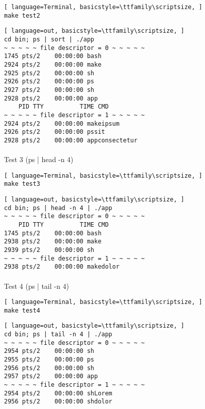 \begin{lstlisting}[ language=Terminal, basicstyle=\ttfamily\scriptsize, ]
make test2
\end{lstlisting}

\begin{lstlisting}[ language=out, basicstyle=\ttfamily\scriptsize, ]
cd bin; ps | sort | ./app
~ ~ ~ ~ ~ file descriptor = 0 ~ ~ ~ ~ ~
1745 pts/2    00:00:00 bash
2924 pts/2    00:00:00 make
2925 pts/2    00:00:00 sh
2926 pts/2    00:00:00 ps
2927 pts/2    00:00:00 sh
2928 pts/2    00:00:00 app
    PID TTY          TIME CMD
~ ~ ~ ~ ~ file descriptor = 1 ~ ~ ~ ~ ~
2924 pts/2    00:00:00 makeipsum
2926 pts/2    00:00:00 pssit
2928 pts/2    00:00:00 appconsectetur
\end{lstlisting}

\paragraph{}
Test 3 (ps | head -n 4)

\begin{lstlisting}[ language=Terminal, basicstyle=\ttfamily\scriptsize, ]
make test3
\end{lstlisting}

\begin{lstlisting}[ language=out, basicstyle=\ttfamily\scriptsize, ]
cd bin; ps | head -n 4 | ./app
~ ~ ~ ~ ~ file descriptor = 0 ~ ~ ~ ~ ~
    PID TTY          TIME CMD
1745 pts/2    00:00:00 bash
2938 pts/2    00:00:00 make
2939 pts/2    00:00:00 sh
~ ~ ~ ~ ~ file descriptor = 1 ~ ~ ~ ~ ~
2938 pts/2    00:00:00 makedolor
\end{lstlisting}

\paragraph{}
Test 4 (ps | tail -n 4)

\begin{lstlisting}[ language=Terminal, basicstyle=\ttfamily\scriptsize, ]
make test4
\end{lstlisting}

\begin{lstlisting}[ language=out, basicstyle=\ttfamily\scriptsize, ]
cd bin; ps | tail -n 4 | ./app
~ ~ ~ ~ ~ file descriptor = 0 ~ ~ ~ ~ ~
2954 pts/2    00:00:00 sh
2955 pts/2    00:00:00 ps
2956 pts/2    00:00:00 sh
2957 pts/2    00:00:00 app
~ ~ ~ ~ ~ file descriptor = 1 ~ ~ ~ ~ ~
2954 pts/2    00:00:00 shLorem
2956 pts/2    00:00:00 shdolor
\end{lstlisting}
